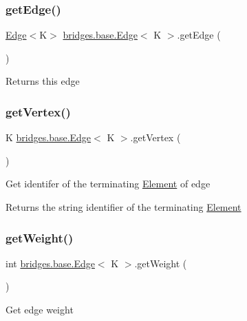 \subsubsection{\texorpdfstring{get\+Edge()}{getEdge()}}
{\footnotesize\ttfamily \hyperlink{classbridges_1_1base_1_1_edge}{Edge}$<$K$>$ \hyperlink{classbridges_1_1base_1_1_edge}{bridges.\+base.\+Edge}$<$ K $>$.get\+Edge (\begin{DoxyParamCaption}{ }\end{DoxyParamCaption})}

Returns this edge \hypertarget{classbridges_1_1base_1_1_edge_a3108d7f80c0b033b1be1185daf715836}{}\label{classbridges_1_1base_1_1_edge_a3108d7f80c0b033b1be1185daf715836} 
\subsubsection{\texorpdfstring{get\+Vertex()}{getVertex()}}
{\footnotesize\ttfamily K \hyperlink{classbridges_1_1base_1_1_edge}{bridges.\+base.\+Edge}$<$ K $>$.get\+Vertex (\begin{DoxyParamCaption}{ }\end{DoxyParamCaption})}

Get identifer of the terminating \hyperlink{classbridges_1_1base_1_1_element}{Element} of edge

\begin{DoxyReturn}{Returns}
the string identifier of the terminating \hyperlink{classbridges_1_1base_1_1_element}{Element} 
\end{DoxyReturn}
\hypertarget{classbridges_1_1base_1_1_edge_a2b6a382a0a4a4c2c55a40c5954c7845d}{}\label{classbridges_1_1base_1_1_edge_a2b6a382a0a4a4c2c55a40c5954c7845d} 
\subsubsection{\texorpdfstring{get\+Weight()}{getWeight()}}
{\footnotesize\ttfamily int \hyperlink{classbridges_1_1base_1_1_edge}{bridges.\+base.\+Edge}$<$ K $>$.get\+Weight (\begin{DoxyParamCaption}{ }\end{DoxyParamCaption})}

Get edge weight

